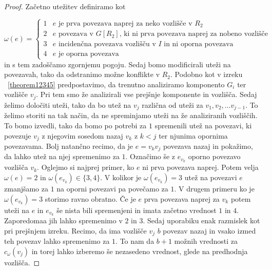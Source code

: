 \documentclass[12pt,a4paper,twoside]{article}
\theoremstyle{definition} %
\theoremstyle{plain} %
\numberwithin{equation}{section}  %
\begin{document}
\begin{proof}
Začetno utežitev definiramo kot

$$ \omega(e) =\begin{cases}
	1 & e \text{ je prva povezava naprej za neko vozlišče v } R_2\\ 
	2 & e \text{ povezava v $G[R_2]$, ki ni prva povezava naprej za nobeno vozlišče} \\
	3 & e \text{ incidenčna povezava vozlišču v $I$ in ni oporna povezava} \\
4 & e \text{ je oporna povezava} 
	\end{cases}
$$
in s tem zadoščamo zgornjemu pogoju. Sedaj bomo modificirali uteži na povezavah, tako da odstranimo možne konflikte v $R_2$. Podobno kot v izreku ~\ref{theorem12345} predpostavimo, da trenutno analiziramo komponento $G_i$ ter vozlišče $v_j$. Pri tem smo že analizirali vse prejšnje komponente in vozlišča. Sedaj želimo določiti uteži, tako da bo utež na $v_j$ različna od uteži za $v_1, v_2, \ldots v_{j-1}$. To želimo storiti na tak način, da ne spreminjamo uteži na že analiziranih vozliščih. To bomo izvedli, tako da bomo po potrebi za $1$ spremenili utež na povezavi, ki povezuje $v_j$ z njegovim sosedom nazaj $v_k$ z $k < j$ ter njunima opornima povezavama. Bolj natančno recimo, da je $e = v_kv_j$ povezava nazaj in pokažimo, da lahko utež na njej spremenimo za $1$. Označimo še z $e_{v_k}$ oporno povezavo vozlišča $v_k$. Oglejmo si najprej primer, ko $e$ ni prva povezava naprej. Potem velja $\omega(e) = 2$ in $\omega(e_{v_k}) \in \{3, 4\}$. V kolikor je $\omega(e_{v_k}) = 3$ utež na povezavi $e$ zmanjšamo za $1$ na oporni povezavi pa povečamo za $1$. V drugem primeru ko je $\omega(e_{v_k}) = 3$ storimo ravno obratno. Če je $e$ prva povezava naprej za $v_k$ potem uteži na $e$ in $e_{v_k}$ še nista bili spremenjeni in imata začetno vrednost $1$ in $4$. Zaporedomaa jih lahko spremenimo v $2$ in $3$. Sedaj uporabiku enak razmislek kot pri prejšnjem izreku. Recimo, da ima vozlišče $v_j$ $b$ povezav nazaj in vsako izmed teh povezav lahko spremenimo za $1$. To nam da $b + 1$ možnih vrednosti za $c_{\omega}(v_j)$ in torej lahko izberemo še nezasedeno vrednost, glede na predhodnja vozlišča.


\end{proof}
\end{document}
